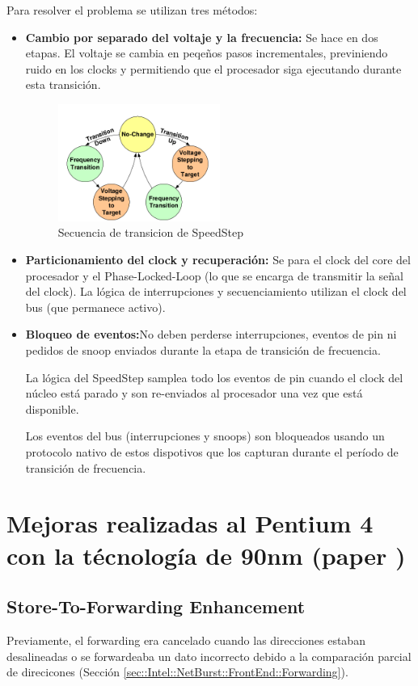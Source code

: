Para resolver el problema se utilizan tres métodos:
\begin{itemize}
	\item \textbf{Cambio por separado del voltaje y la frecuencia:} Se hace en dos etapas. El voltaje se cambia en peqeños pasos incrementales, previniendo ruido en los clocks y permitiendo que el procesador siga ejecutando durante esta transición. 
	
	\begin{figure}[ht]
		\centering
		\includegraphics[width=0.5\textwidth]{imagenes/voltage-transitions}
		\caption{Secuencia de transicion de SpeedStep}
		\label{fig:voltageTransitions}
	\end{figure}

\item \textbf{Particionamiento del clock y recuperación:} Se para el clock del core del procesador y el Phase-Locked-Loop (lo que se encarga de transmitir la señal del clock). La lógica de interrupciones y secuenciamiento utilizan el clock del bus (que permanece activo).

\item \textbf{Bloqueo de eventos:}No deben perderse interrupciones, eventos de pin ni pedidos de snoop enviados durante la etapa de transición de frecuencia.

La lógica del SpeedStep samplea todo los eventos de pin cuando el clock del núcleo está parado y son re-enviados al procesador una vez que está disponible.

Los eventos del bus (interrupciones y snoops) son bloqueados usando un protocolo nativo de estos dispotivos que los capturan durante el período de transición de frecuencia.
\end{itemize}

\newpage
\section{Mejoras realizadas al Pentium 4 con la técnología de 90nm (paper \cite{Boggs2004TheMO})}
\subsection{Store-To-Forwarding Enhancement}
Previamente, el forwarding era cancelado cuando las direcciones estaban desalineadas o se forwardeaba un dato incorrecto debido a la comparación parcial de direcicones (Sección \ref{sec::Intel::NetBurst::FrontEnd::Forwarding}).


